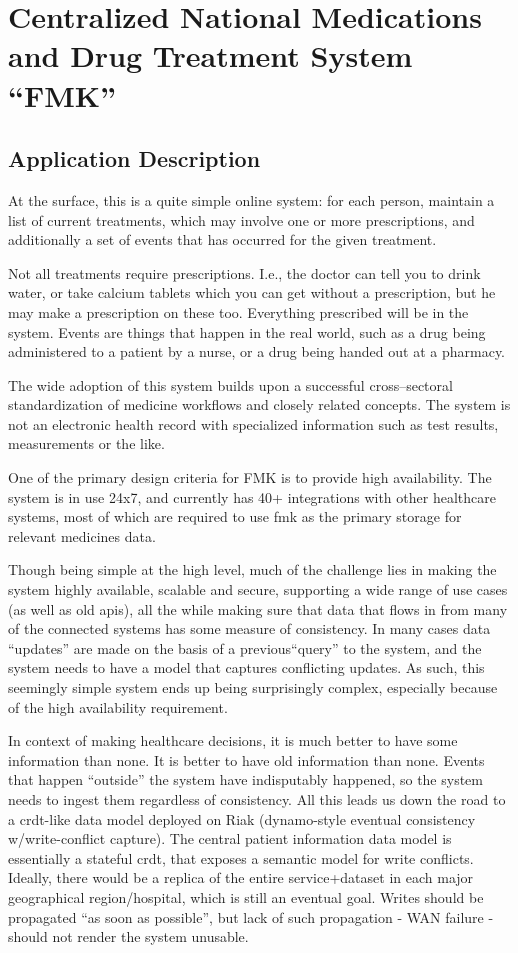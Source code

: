 \documentclass[11pt,a4paper]{report}
\begin{document}
\section{Centralized National Medications and Drug Treatment System ``FMK''}
\subsection{Application Description}
At the surface, this is a quite simple online system: for each person, maintain a list of current treatments, which may involve one or more prescriptions, and additionally a set of events that has occurred for the given treatment. 

Not all treatments require prescriptions. I.e., the doctor can tell you to drink water, or take calcium tablets which you can get without a prescription, but he may make a prescription on these too. Everything prescribed will be in the system. Events are things that happen in the real world, such as a drug being administered to a patient by a nurse, or a drug being handed out at a pharmacy. 

The wide adoption of this system builds upon a successful cross--sectoral standardization of medicine workflows and closely related concepts. The system is not an electronic health record with specialized information such as test results, measurements or the like.

One of the primary design criteria for FMK is to provide high availability. The system is in use 24x7, and currently has 40+ integrations with other healthcare systems, most of which are required to use \gls{fmk} as the primary storage for relevant medicines data.

Though being simple at the high level, much of the challenge lies in making the system highly available, scalable and secure, supporting a wide range of use cases (as well as old \glspl{api}), all the while making sure that data that flows in from many of the connected systems has some measure of consistency. In many cases data ``updates'' are made on the basis of a previous``query'' to the system, and the system needs to have a model that captures conflicting updates. As such, this seemingly simple system ends up being surprisingly complex, especially because of the high availability requirement.

In context of making healthcare decisions, it is much better to have some information than none. It is better to have old information than none. Events that happen ``outside'' the system have indisputably happened, so the system needs to ingest them regardless of consistency.
All this leads us down the road to a \gls{crdt}-like data model deployed on Riak (dynamo-style eventual consistency w/write-conflict capture). The central patient information data model is essentially a stateful \gls{crdt}, that exposes a semantic model for write conflicts. Ideally, there would be a replica of the entire service+dataset in each major geographical region/hospital, which is still an eventual goal. Writes should be propagated ``as soon as possible'', but lack of such propagation - WAN failure - should not render the system unusable.
\end{document}
